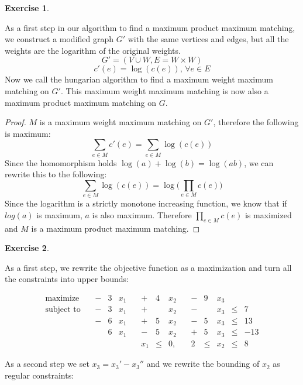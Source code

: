 \documentclass[a4paper,12pt,headsepline]{scrartcl}
\newtheorem{aufgabe}{Exercise}
\begin{document}
\newpage
\begin{aufgabe}
\end{aufgabe}

As a first step in our algorithm to find a maximum product maximum matching, we construct a modified graph $G'$ with the same vertices and edges, but all the weights are the logarithm of the original weights.
\[ G' = (V\cup W,E=W\times W) \]
\[ c'(e) = \log(c(e)),\,\forall e\in E \]
Now we call the hungarian algorithm to find a maximum weight maximum matching on $G'$.
This maximum weight maximum matching is now also a maximum product maximum matching on $G$.

\begin{proof}
  $M$ is a maximum weight maximum matching on $G'$, therefore the following is maximum:
  \[ \sum_{e\in M}c'(e) = \sum_{e\in M}\log(c(e)) \]
  Since the homomorphism holds $\log(a)+\log(b)=\log(ab)$, we can rewrite this to the following:
  \[ \sum_{e\in M}\log(c(e)) = \log\Big(\prod_{e\in M}c(e)\Big) \]
  Since the logarithm is a strictly monotone increasing function, we know that if $log(a)$ is maximum, $a$ is also maximum.
  Therefore $\prod_{e\in M}c(e)$ is maximized and $M$ is a maximum product maximum matching.
\end{proof}
 
\newpage
\begin{aufgabe}
\end{aufgabe}

As a first step, we rewrite the objective function as a maximization and turn all the constraints into upper bounds:

\begin{equation*}
  \begin{aligned}
    \text{maximize}   & \, & - & 3 & x_1 & \, & +   & 4   & x_2 & \, & - & 9   & x_3 &     &     \\
    \text{subject to} & \, & - & 3 & x_1 & \, & +   &     & x_2 & \, & - &     & x_3 & \le & 7   \\
                      & \, & - & 6 & x_1 & \, & +   & 5   & x_2 & \, & - & 5   & x_3 & \le & 13  \\
                      & \, &   & 6 & x_1 & \, & -   & 5   & x_2 & \, & + & 5   & x_3 & \le & -13 \\
                      & \, &   &   &     & \, & x_1 & \le & 0,  & \, & 2 & \le & x_2 & \le & 8   
  \end{aligned}
\end{equation*}

As a second step we set $x_3=x_3'-x_3''$ and we rewrite the bounding of $x_2$ as regular constraints:
\end{document}
